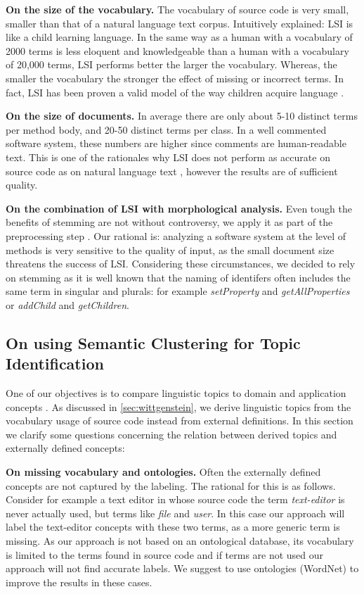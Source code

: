 \textbf{On the size of the vocabulary.}  The vocabulary of source code is very small, smaller than that of a natural language text corpus. Intuitively explained: LSI is like a child learning language. In the same way as a human with a vocabulary of 2000 terms is less eloquent and knowledgeable than a human with a vocabulary of 20,000 terms, LSI performs better the larger the vocabulary. Whereas, the smaller the vocabulary the stronger the effect of missing or incorrect terms. In fact, LSI has been proven a valid model of the way children acquire language \cite{Land97a}.

\textbf{On the size of documents.} In average there are only about 5-10 distinct terms per method body, and 20-50 distinct terms per class. In a well commented software system, these numbers are higher since comments are human-readable text. This is one of the rationales why LSI does not perform as accurate on source code as on natural language text \cite{Luci04a}, however the results are of sufficient quality.

\textbf{On the combination of LSI with morphological analysis.} Even tough the benefits of stemming are not without controversy, we apply it as part of the preprocessing step \cite{Baez99b}. Our rational is: analyzing a software system at the level of methods is very sensitive to the quality of input, as the small document size threatens the success of LSI. Considering these circumstances, we  decided to rely on stemming as it is well known that the naming of identifers often includes the same term in singular and plurals: for example \emph{setProperty} and \emph{getAllProperties} or \emph{addChild} and \emph{getChildren}.

\subsection{On using Semantic Clustering for Topic Identification}

One of our objectives is to compare linguistic topics to domain and application concepts \cite{Bigg93a}. As discussed in \autoref{sec:wittgenstein}, we derive linguistic topics from the vocabulary usage of source code instead from external definitions. In this section we clarify some questions concerning the relation between derived topics and externally defined concepts:

\textbf{On missing vocabulary and ontologies.} Often the externally defined concepts are not captured by the labeling. The rational for this is as follows. Consider for example a text editor in whose source code the term \emph{text-editor} is never actually used, but terms like \emph{file} and \emph{user}. In this case our approach will label the text-editor concepts with these two terms, as a more generic term is missing. As our approach is not based on an ontological database, its vocabulary is limited to the terms found in source code and if terms are not used our approach will not find accurate labels. We suggest to use ontologies (\ie WordNet) to improve the results in these cases.


